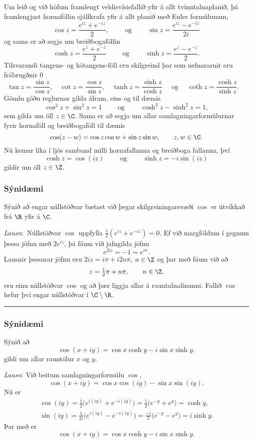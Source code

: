 Um leið og við höfum framlengt veldisvísisfallið
yfir á allt tvinntalnaplanið, þá framlengjast  hornaföllin 
sjálfkrafa yfir á allt planið með Euler formúlunum,
$$
\cos z =\dfrac{e^{iz}+e^{-iz}}2, \qquad \text{ og } \qquad 
\sin z =\dfrac{e^{iz}-e^{-iz}}{2i} 
$$
og sama er að segja um breiðbogaföllin
$$
\cosh z =\dfrac{e^{z}+e^{-z}}2 \qquad \text{ og } \qquad  
\sinh z =\dfrac{e^{z}-e^{-z}}{2}.
$$
Tilsvarandi tangens- og kótangens-föll eru skilgreind þar sem
nefnararnir eru frábrugðnir $0$
$$
\tan z=\dfrac {\sin z}{\cos z}, \quad
\cot z=\dfrac {\cos z}{\sin z}, \quad
\tanh z=\dfrac {\sinh z}{\cosh z} \quad \text{ og } \quad
\coth z=\dfrac {\cosh z}{\sinh z}. \quad
$$
Gömlu góðu reglurnar gilda áfram, eins og til dæmis
$$
\cos^2z+\sin^2z=1  \qquad \text{ og } \qquad \cosh^2z-\sinh^2z=1,
$$
sem gilda um öll $z\in \C$.  Sama er að segja um allar
samlagningarformúlurnar fyrir hornaföll og breiðbogaföll til dæmis
$$
\cos(z-w)=\cos z\cos w+\sin z\sin w, \qquad z,w\in \C.
$$
Nú kemur líka í ljós samband milli  hornafallanna og breiðboga 
fallanna, því
$$
\cosh z=\cos(iz) \qquad \text{  og } \qquad \sinh z=-i \sin(iz)
$$
gildir um öll $z\in \Z$.


\subsubsection{Sýnidæmi} Sýnið að engar núllstöðvar bætast
við þegar skilgreiningarsvæði $\cos$ er útvíkkað frá $\R$ yfir á $\C$.

\smallskip\noindent
{\it Lausn}:\  Núllstöðvar $\cos$ uppfylla $\tfrac
12(e^{iz}+e^{-iz})=0$.  Ef við margföldum í gegnum þessa jöfnu með
$2e^{iz}$, þá fáum við jafngilda jöfnu
$$
e^{2iz}=-1=e^{i\pi}.
$$
Lausnir þessarar jöfnu eru
$2iz=i{\pi}+i2n{\pi}$, $n\in \Z$ og þar með fáum við að
$$
z=\tfrac 12 {\pi}+n{\pi}, \qquad n\in \Z,
$$
eru einu núllstöðvar $\cos$ og að þær liggja allar á
rauntalnalínunni.   Fallið $\cos$ hefur því engar núllstöðvar í
$\C\setminus \R$. 



\bigskip\hrule\bigskip


\subsubsection{Sýnidæmi}  Sýnið að 
$$
\cos(x+iy)=\cos x\cosh y-i\sin x\sinh y.
$$
gildi um allar rauntölur $x$ og $y$.

\smallskip\noindent
{\it Lausn}:  Við beitum samlagningarformúlu $\cos$,
$$
\cos(x+iy)=\cos x\cos(iy)-\sin x\sin (iy).
$$
Nú er
\begin{gather*}
\cos(iy)=\tfrac 12\big(e^{i(iy)}+e^{-i(iy)}\big)=
\tfrac 12 \big(e^{-y}+e^y\big)=\cosh y,\\
\sin(iy)=\tfrac 1{2i}\big(e^{i(iy)}-e^{-i(iy)}\big)=
\tfrac {-i} 2\big(e^{-y}-e^y\big)=i\sinh y.
\end{gather*}
Þar með er
$$
\cos(x+iy)=\cos x\cosh y-i\sin x\sinh y.
$$



